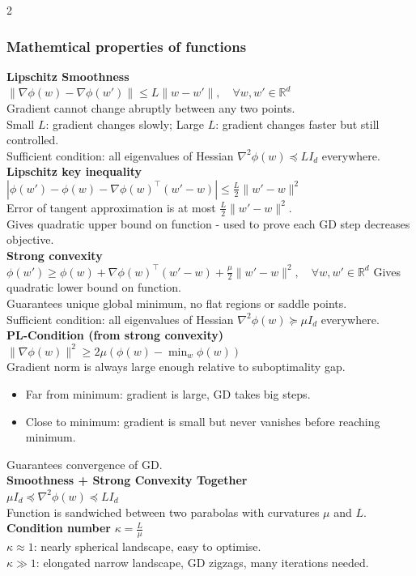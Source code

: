 \documentclass[10pt]{article}
\begin{document}
\begin{multicols*}{2}
\subsubsection*{Mathemtical properties of functions}
\textbf{Lipschitz Smoothness}\\
$\|\nabla\phi(w) - \nabla\phi(w')\| \leq L\|w - w'\|, \quad \forall w, w' \in \mathbb{R}^d$\\
Gradient cannot change abruptly between any two points.\\
Small $L$: gradient changes slowly; Large $L$: gradient changes faster but still controlled.\\
Sufficient condition: all eigenvalues of Hessian $\nabla^2\phi(w) \preceq LI_d$ everywhere.\\
\textbf{Lipschitz key inequality}\\
$|\phi(w') - \phi(w) - \nabla\phi(w)^\top(w'-w)| \leq \frac{L}{2}\|w'-w\|^2$\\
Error of tangent approximation is at most $\frac{L}{2}\|w' - w\|^2$.\\
Gives quadratic upper bound on function - used to prove each GD step decreases objective.\\
\textbf{Strong convexity}\\
$\phi(w') \geq \phi(w) + \nabla\phi(w)^\top(w'-w) + \frac{\mu}{2}\|w'-w\|^2, \quad \forall w, w' \in \mathbb{R}^d$
Gives quadratic lower bound on function.\\
Guarantees unique global minimum, no flat regions or saddle points.\\
Sufficient condition: all eigenvalues of Hessian $\nabla^2\phi(w) \succeq \mu I_d$ everywhere.\\
\textbf{PL-Condition (from strong convexity)}\\
$\|\nabla\phi(w)\|^2 \geq 2\mu\left(\phi(w) - \min_w \phi(w)\right)$\\
Gradient norm is always large enough relative to suboptimality gap.\\
\begin{itemize}
    \item Far from minimum: gradient is large, GD takes big steps.
    \item Close to minimum: gradient is small but never vanishes before reaching minimum.
\end{itemize}
Guarantees convergence of GD.\\
\textbf{Smoothness + Strong Convexity Together}\\
$\mu I_d \preceq \nabla^2\phi(w) \preceq LI_d$\\
Function is sandwiched between two parabolas with curvatures $\mu$ and $L$.\\
\textbf{Condition number} $\kappa = \frac{L}{\mu}$\\
$\kappa \approx 1$: nearly spherical landscape, easy to optimise.\\
$\kappa \gg 1$: elongated narrow landscape, GD zigzags, many iterations needed.


\end{multicols*}
\end{document}
